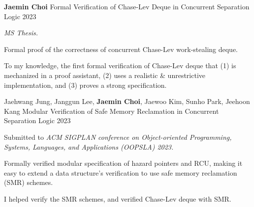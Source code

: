 

\begin{cventries}

  \cventryPub
    {\textbf{Jaemin Choi}} %
    {Formal Verification of Chase-Lev Deque in Concurrent Separation Logic} %
    {2023} %
    {
      \textit{MS Thesis.}
      \begin{cvitems}
        \item[]
        \item Formal proof of the correctness of concurrent Chase-Lev work-stealing deque.
        \item To my knowledge, the first formal verification of Chase-Lev deque that (1) is mechanized in a proof assistant, (2) uses a realistic \& unrestrictive implementation, and (3) proves a strong specification.
      \end{cvitems}
    }

  \cventryPub
    {Jaehwang Jung, Janggun Lee, \textbf{Jaemin Choi}, Jaewoo Kim, Sunho Park, Jeehoon Kang} %
    {Modular Verification of Safe Memory Reclamation in Concurrent Separation Logic} %
    {2023} %
    {
      Submitted to \textit{ACM SIGPLAN conference on Object-oriented Programming, Systems, Languages, and Applications (OOPSLA) 2023.}
      \begin{cvitems}
        \item[]
        \item Formally verified modular specification of hazard pointers and RCU, making it easy to extend a data structure's verification to use safe memory reclamation (SMR) schemes.
        \item I helped verify the SMR schemes, and verified Chase-Lev deque with SMR.
      \end{cvitems}
    }


\end{cventries}
